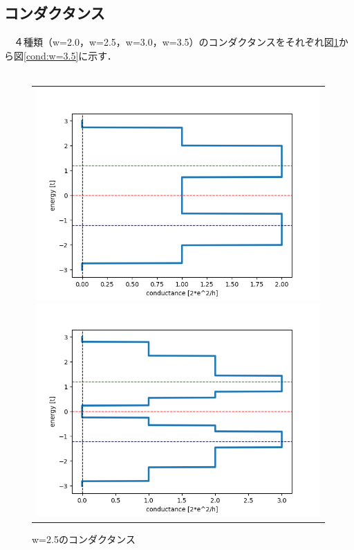 \newpage
\subsection{コンダクタンス}
　４種類（w=2.0，w=2.5，w=3.0，w=3.5）のコンダクタンスをそれぞれ図\ref{cond:w=2.0}から図\ref{cond:w=3.5}に示す．\\
\\
\begin{figure}[htpb]
  \centering

  \begin{tabular}{c}
    \begin{minipage}{0.50\hsize}
    \centering
    \includegraphics[keepaspectratio, scale=0.55]{./data/w2/w2-j_cond.png}
    \caption{w=2.0のコンダクタンス}
    \label{cond:w=2.0}
    \end{minipage}

    \begin{minipage}{0.50\hsize}
    \centering
    \includegraphics[keepaspectratio, scale=0.55]{./data/w2_5/w2_5-j_cond.png}
    \caption{w=2.5のコンダクタンス}
    \end{minipage}


\end{tabular}
\end{figure}
